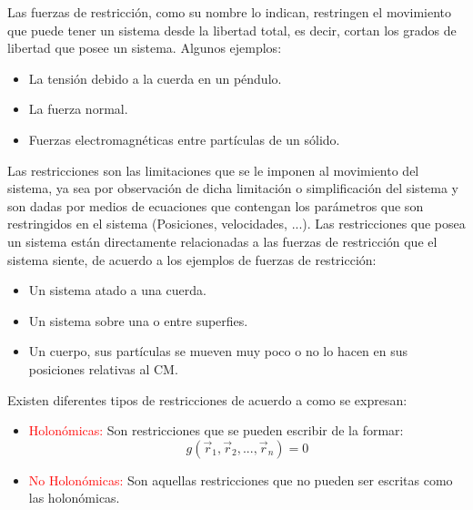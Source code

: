 \documentclass[/home/hernan-barquero/Documents/Apuntes_mecanica_teorica/main.tex]{subfiles}
\begin{document}
    \begin{definition}
        Las fuerzas de restricción, como su nombre lo indican, restringen el movimiento que puede tener un sistema desde la libertad total, es decir, cortan los grados de libertad que posee un sistema. Algunos ejemplos:
        \begin{itemize}
            \item La tensión debido a la cuerda en un péndulo.
            \item La fuerza normal.
            \item Fuerzas electromagnéticas entre partículas de un sólido.
        \end{itemize}
    \end{definition}

    \begin{definition}
        Las restricciones son las limitaciones que se le imponen al movimiento del sistema, ya sea por observación de dicha limitación o simplificación del sistema y son dadas por medios de ecuaciones que contengan los parámetros que son restringidos en el sistema (Posiciones, velocidades, ...). Las restricciones que posea un sistema están directamente relacionadas a las fuerzas de restricción que el sistema siente, de acuerdo a los ejemplos de fuerzas de restricción:

        \begin{itemize}
            \item Un sistema atado a una cuerda.
            \item Un sistema sobre una o entre superfies.
            \item Un cuerpo, sus partículas se mueven muy poco o no lo hacen en sus posiciones relativas al CM.
        \end{itemize}
        
        Existen diferentes tipos de restricciones de acuerdo a como se expresan:

        \begin{itemize}
            \item \textcolor{red}{Holonómicas:} Son restricciones que se pueden escribir de la formar: 
                \begin{equation}
                    g\left(\vec{r}_{1},\vec{r}_{2}, ...,\vec{r}_{n}\right) = 0
                \end{equation}
            \item \textcolor{red}{No Holonómicas:} Son aquellas restricciones que no pueden ser escritas como las holonómicas.
        \end{itemize}


\end{definition}
\end{document}
